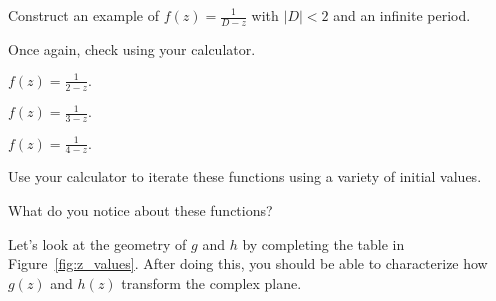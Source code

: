 \documentclass[../gatm_answers.tex]{subfiles}
\begin{document}
\begin{inner_problem}
\item Construct an example of $f(z)=\frac{1}{D-z}$ with $|D|<2$ and an infinite period.
\end{inner_problem}

\begin{inner_problem}
\item Once again, check using your calculator.
\end{inner_problem}

\begin{outer_problem}
\item
\end{outer_problem}


\begin{iinner_problem}[start=1]
\item $f(z)=\frac{1}{2-z}.$
\end{iinner_problem}

\begin{iinner_problem}
\item $f(z)=\frac{1}{3-z}.$
\end{iinner_problem}

\begin{iinner_problem}
\item $f(z)=\frac{1}{4-z}.$
\end{iinner_problem}

\begin{inner_problem}
\item Use your calculator to iterate these functions using a variety of initial values.
\end{inner_problem}

\begin{inner_problem}
\item What do you notice about these functions?
\end{inner_problem}

\begin{outer_problem}
\item Let's look at the geometry of $g$ and $h$ by completing the table in Figure~\ref{fig:z_values}. After doing this, you should be able to characterize how $g(z)$ and $h(z)$ transform the complex plane.
\end{outer_problem}
\end{document}
